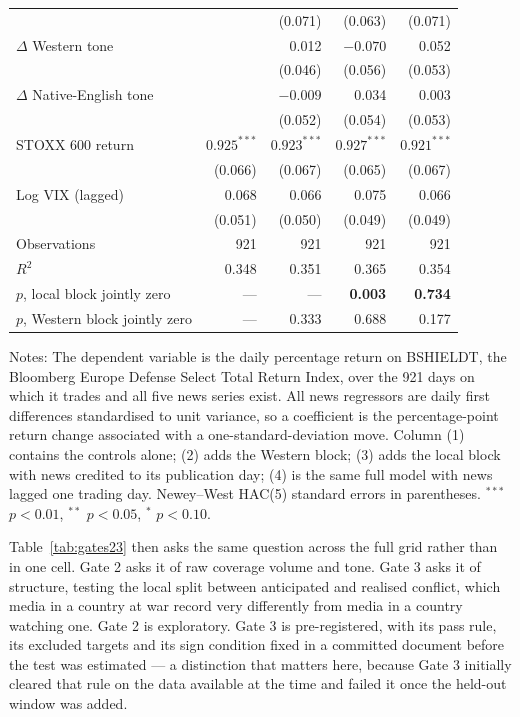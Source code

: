 \documentclass[12pt,a4paper]{article}
\begin{document}
\begin{table}[htbp]
\begin{threeparttable}
\begin{tabular}{lrrrr}
 & & (0.071) & (0.063) & (0.071) \\
$\Delta$ Western tone & & 0.012 & $-0.070$ & 0.052 \\
 & & (0.046) & (0.056) & (0.053) \\
$\Delta$ Native-English tone & & $-0.009$ & 0.034 & 0.003 \\
 & & (0.052) & (0.054) & (0.053) \\
\addlinespace
STOXX 600 return & $0.925^{***}$ & $0.923^{***}$ & $0.927^{***}$ & $0.921^{***}$ \\
 & (0.066) & (0.067) & (0.065) & (0.067) \\
Log VIX (lagged) & 0.068 & 0.066 & 0.075 & 0.066 \\
 & (0.051) & (0.050) & (0.049) & (0.049) \\
\midrule
Observations & 921 & 921 & 921 & 921 \\
$R^2$ & 0.348 & 0.351 & 0.365 & 0.354 \\
$p$, local block jointly zero & --- & --- & \textbf{0.003} & \textbf{0.734} \\
$p$, Western block jointly zero & --- & 0.333 & 0.688 & 0.177 \\
\bottomrule
\end{tabular}
\begin{tablenotes}
\footnotesize
\item Notes: The dependent variable is the daily percentage return on BSHIELDT,
the Bloomberg Europe Defense Select Total Return Index, over the 921 days on
which it trades and all five news series exist. All news regressors are daily
first differences standardised to unit variance, so a coefficient is the
percentage-point return change associated with a one-standard-deviation move.
Column (1) contains the controls alone; (2) adds the Western block; (3) adds the
local block with news credited to its publication day; (4) is the same full
model with news lagged one trading day. Newey--West HAC(5) standard errors in
parentheses. $^{***}$ $p<0.01$, $^{**}$ $p<0.05$, $^{*}$ $p<0.10$.
\end{tablenotes}
\end{threeparttable}
\end{table}

Table~\ref{tab:gates23} then asks the same question across the full grid rather than in one cell. Gate 2 asks it of raw coverage volume and tone. Gate 3 asks it of structure, testing the local split between anticipated and realised conflict, which media in a country at war record very differently from media in a country watching one. Gate 2 is exploratory. Gate 3 is pre-registered, with its pass rule, its excluded targets and its sign condition fixed in a committed document before the test was estimated --- a distinction that matters here, because Gate 3 initially cleared that rule on the data available at the time and failed it once the held-out window was added.
\end{document}
